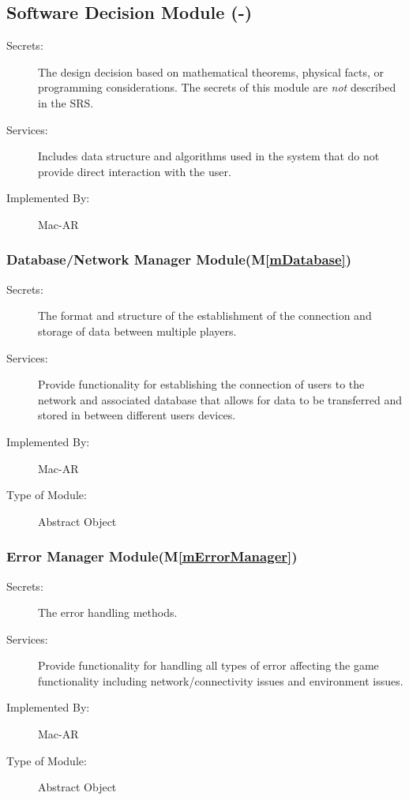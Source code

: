 \documentclass[12pt, titlepage]{article}
\newcommand{\mref}[1]{M\ref{#1}}
\begin{document}
\subsection{Software Decision Module (-)}

\begin{description}
\item[Secrets:] The design decision based on mathematical theorems, physical
  facts, or programming considerations. The secrets of this module are
  \emph{not} described in the SRS.
\item[Services:] Includes data structure and algorithms used in the system that
  do not provide direct interaction with the user. 
\item[Implemented By:] Mac-AR
\end{description}

\subsubsection{Database/Network Manager Module(\mref{mDatabase})}
\begin{description}
\item[Secrets:]The format and structure of the establishment of the connection and storage of data between multiple players.
\item[Services:]Provide functionality for establishing the connection of users to the network and associated database that allows for data to be transferred and stored in between different users devices.
\item[Implemented By:] Mac-AR
\item[Type of Module:] Abstract Object
\end{description}

\subsubsection{Error Manager Module(\mref{mErrorManager})}
\begin{description}
\item[Secrets:]The error handling methods.
\item[Services:]Provide functionality for handling all types of error affecting the game functionality including network/connectivity issues and environment issues.
\item[Implemented By:] Mac-AR
\item[Type of Module:] Abstract Object
\end{description}
\end{document}
